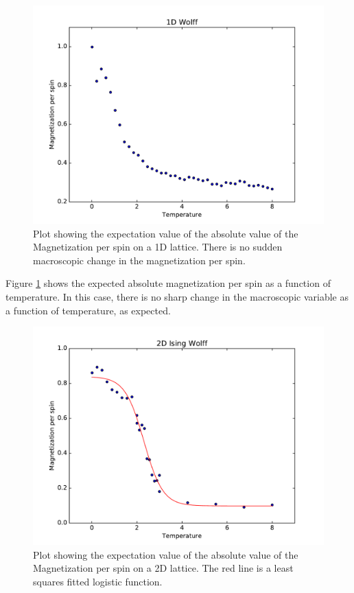 \documentclass[a4paper]{article}
\begin{document}
\begin{figure}[htb!]
	\centering \includegraphics[width=\linewidth]{1D_Wolff.pdf}
	\caption{Plot showing the expectation value of the absolute value of the Magnetization per spin on a 1D lattice. There is no sudden macroscopic change in the magnetization per spin.}
	\label{fig:wolff1}
\end{figure}

Figure \ref{fig:wolff1} shows the expected absolute magnetization per spin as a function of temperature. In this case, there is no sharp change in the macroscopic variable as a function of temperature, as expected.

\begin{figure}[htb!]
	\centering \includegraphics[width=\linewidth]{2D_Wolff.pdf}
	\caption{Plot showing the expectation value of the absolute value of the Magnetization per spin on a 2D lattice. The red line is a least squares fitted logistic function.}
	\label{fig:wolff2}
\end{figure}
\end{document}
